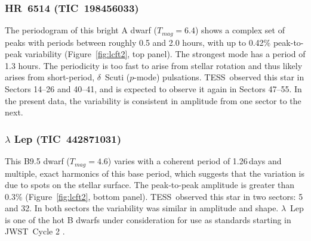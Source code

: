 \documentclass[twocolumn]{aastex631}
\newcommand{\jwst}{JWST}
\newcommand{\tess}{TESS}
\begin{document}
\subsubsection{HR~6514 (TIC~198456033)} %

The periodogram of this bright A dwarf ($T_{mag}=6.4$) shows a complex set of peaks with periods between roughly 0.5 and 2.0 hours, with up to 0.42\% peak-to-peak variability (Figure~\ref{fig:lcft2}, top panel).  The strongest mode has a period of 1.3 hours.  The periodicity is too fast to arise from stellar rotation and thus likely arises from short-period, $\delta$~Scuti ($p$-mode) pulsations.  \tess\ observed this star in Sectors 14--26 and 40--41, and is expected to observe it again in Sectors 47--55.  In the present data, the variability is consistent in amplitude from one sector to the next. 


\subsubsection{$\lambda$ Lep (TIC~442871031)}

This B9.5 dwarf ($T_{mag}=4.6$) varies with a coherent period of 1.26\,days and multiple, exact harmonics of this base period, which suggests that the variation is due to spots on the stellar surface. The peak-to-peak amplitude is greater than 0.3\% (Figure~\ref{fig:lcft2}, bottom panel). \tess\ observed this star in two sectors: 5 and 32. In both sectors the variability was similar in amplitude and shape. $\lambda$~Lep is one of the hot B dwarfs under consideration for use as standards starting in \jwst\ Cycle 2 \citep{Gordon2022inprep}. 
\end{document}

